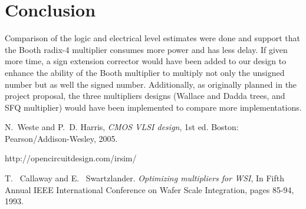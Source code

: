 \documentclass[conference]{IEEEtran}
\begin{document}

\FloatBarrier
\section{Conclusion}
Comparison of the logic and electrical level estimates were done and support that the Booth radix-4 multiplier consumes more power and has less delay. If given more time, a sign extension corrector would have been added to our design to enhance the ability of the Booth multiplier to multiply not only the unsigned number but as well the signed number. Additionally, as originally planned in the project proposal, the three multipliers designs (Wallace and Dadda trees, and SFQ multiplier) would have been implemented to compare more implementations. 




%
%
%
\begin{thebibliography}{1}

N.~Weste and P.~D. Harris, \emph{CMOS VLSI design}, 1st ed. Boston: Pearson/Addison-Wesley, 2005.

http://opencircuitdesign.com/irsim/

T. ~Callaway and E. ~Swartzlander.  \emph{Optimizing multipliers for WSI}, In Fifth Annual IEEE International Conference on Wafer Scale Integration, pages 85-94, 1993.
\end{thebibliography}


\end{document}
